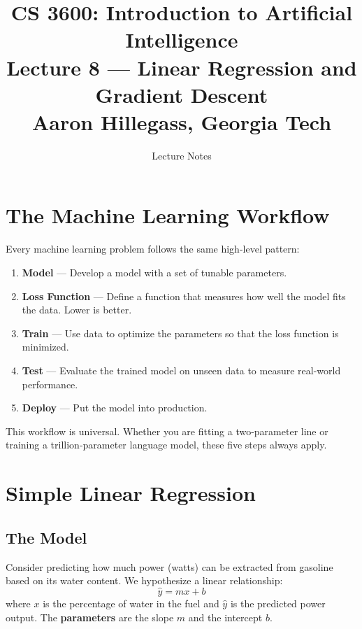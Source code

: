 \documentclass[12pt]{article}
\title{
  \textbf{CS 3600: Introduction to Artificial Intelligence}\\[0.5em]
  \large Lecture 8 --- Linear Regression and Gradient Descent\\[0.3em]
  \normalsize Aaron Hillegass, Georgia Tech
}
\author{Lecture Notes}
\date{}
\begin{document}
\maketitle
\tableofcontents
\newpage

\section{The Machine Learning Workflow}

Every machine learning problem follows the same high-level pattern:

\begin{enumerate}
  \item \textbf{Model} --- Develop a model with a set of tunable parameters.
  \item \textbf{Loss Function} --- Define a function that measures how well the model fits the data. Lower is better.
  \item \textbf{Train} --- Use data to optimize the parameters so that the loss function is minimized.
  \item \textbf{Test} --- Evaluate the trained model on unseen data to measure real-world performance.
  \item \textbf{Deploy} --- Put the model into production.
\end{enumerate}

\begin{notebox}
This workflow is universal. Whether you are fitting a two-parameter line or training a trillion-parameter language model, these five steps always apply.
\end{notebox}

\section{Simple Linear Regression}

\subsection{The Model}

Consider predicting how much power (watts) can be extracted from gasoline based on its water content. We hypothesize a linear relationship:
\[
\hat{y} = mx + b
\]
where $x$ is the percentage of water in the fuel and $\hat{y}$ is the predicted power output. The \textbf{parameters} are the slope $m$ and the intercept $b$.
\end{document}
